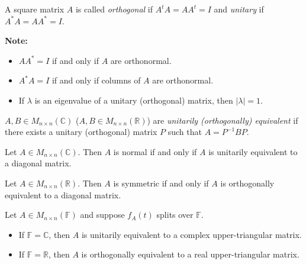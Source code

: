 \documentclass[12pt]{article}
\newenvironment{theorem}[2][Theorem]{\begin{trivlist}
\item[\hskip \labelsep {\bfseries #1}\hskip \labelsep {\bfseries #2.}]}{\end{trivlist}}
\newenvironment{definition}[2][Definition]{\begin{trivlist}
\item[\hskip \labelsep {\bfseries #1}\hskip \labelsep {\bfseries #2}]}{\end{trivlist}}
\begin{document}
\begin{definition}{10}
A square matrix $A$ is called \textit{orthogonal} if $A^tA = AA^t = I$ and \textit{unitary} if $A^*A = AA^* = I$.
\end{definition}

\noindent\textbf{Note:} \text{ }

\begin{itemize}
    \item $AA^* = I$ if and only if $A$ are orthonormal.
    
    \item $A^*A = I$ if and only if columns of $A$ are orthonormal. 
    
    \item If $\lambda$ is an eigenvalue of a unitary (orthogonal) matrix, then $\lvert \lambda \rvert = 1$.
\end{itemize}

\begin{definition}{11}
$A, B \in M_{n \times n}(\mathbb{C})$ ($A, B \in M_{n \times n}(\mathbb{R})$) are \textit{unitarily (orthogonally) equivalent} if there exists a unitary (orthogonal) matrix $P$ such that $A = P^{-1}BP$.
\end{definition}

\begin{theorem}{6.19}
Let $A \in M_{n \times n}(\mathbb{C})$. Then $A$ is normal if and only if $A$ is unitarily equivalent to a diagonal matrix. 
\end{theorem}

\begin{theorem}{6.20}
Let $A \in M_{n \times n}(\mathbb{R})$. Then $A$ is symmetric if and only if $A$ is orthogonally equivalent to a diagonal matrix.
\end{theorem}

\begin{theorem}{6.21 (Schur)}
Let $A \in M_{n \times n}(\mathbb{F})$ and suppose $f_A(t)$ splits over $\mathbb{F}$.

\begin{itemize}
    \item[(a)] If $\mathbb{F} = \mathbb{C}$, then $A$ is unitarily equivalent to a complex upper-triangular matrix.
    
    \item[(b)] If $\mathbb{F} = \mathbb{R}$, then $A$ is orthogonally equivalent to a real upper-triangular matrix.
\end{itemize}
\end{theorem}
\end{document}
